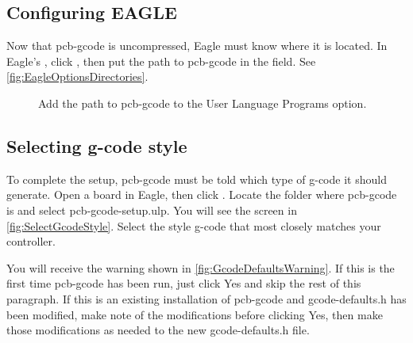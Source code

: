 \documentclass[11pt]{book}
\begin{document}
\subsection{Configuring EAGLE}
Now that pcb-gcode is uncompressed, Eagle must know where it is located. In Eagle's , click , then put the path to pcb-gcode in the  field. See \figurename \vref{fig:EagleOptionsDirectories}.

\begin{figure}
	\caption{Add the path to pcb-gcode to the User Language Programs option.}
	\label{fig:EagleOptionsDirectories}
\end{figure}

\subsection{Selecting g-code style}\label{sub:SelectingGCodeStyle}
To complete the setup, pcb-gcode must be told which type of g-code it should generate. Open a board in Eagle, then click . Locate the folder where pcb-gcode is and select pcb-gcode-setup.ulp. You will see the screen in \figurename \vref{fig:SelectGcodeStyle}. Select the style g-code that most closely matches your controller.

You will receive the warning shown in \figurename \vref{fig:GcodeDefaultsWarning}. If this is the first time pcb-gcode has been run, just click Yes and skip the rest of this paragraph. If this is an existing installation of pcb-gcode and gcode-defaults.h has been modified, make note of the modifications before clicking Yes, then make those modifications as needed to the new gcode-defaults.h file.
\end{document}
